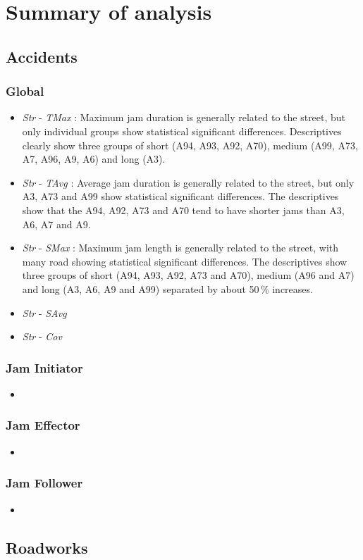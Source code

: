 \chapter{Summary of analysis}
\label{analysis_summary}


\section{Accidents}

\subsection{Global}

\begin{itemize}
    \item \textit{Str} - \textit{TMax} : Maximum jam duration is generally related to the street, but only individual groups show statistical significant differences. Descriptives clearly show three groups of short (A94, A93, A92, A70), medium (A99, A73, A7, A96, A9, A6) and long (A3).
    \item \textit{Str} - \textit{TAvg} : Average jam duration is generally related to the street, but only A3, A73 and A99 show statistical significant differences. The descriptives show that the A94, A92, A73 and A70 tend to have shorter jams than A3, A6, A7 and A9.
    \item \textit{Str} - \textit{SMax} : Maximum jam length is generally related to the street, with many road showing statistical significant differences. The descriptives show three groups of short (A94, A93, A92, A73 and A70), medium (A96 and A7) and long (A3, A6, A9 and A99) separated by about 50\,\% increases.
    \item \textit{Str} - \textit{SAvg}
    \item \textit{Str} - \textit{Cov}
\end{itemize}

\subsection{Jam Initiator}

\begin{itemize}
    \item 
\end{itemize}

\subsection{Jam Effector}

\begin{itemize}
    \item 
\end{itemize}

\subsection{Jam Follower}

\begin{itemize}
    \item 
\end{itemize}

\section{Roadworks}


